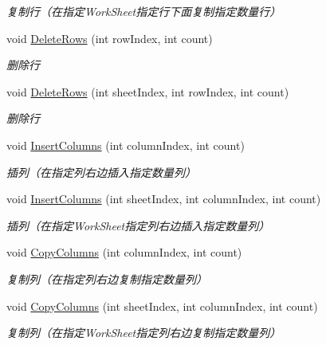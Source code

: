 \begin{DoxyCompactItemize}
\begin{DoxyCompactList}\small\item\em 复制行（在指定\+Work\+Sheet指定行下面复制指定数量行） \end{DoxyCompactList}\item 
void \hyperlink{class_x_c_l_net_tools_1_1_office_1_1_excel_handler_1_1_excel_helper_a04ebe281303c12b0bba570dfc1fb72b5}{Delete\+Rows} (int row\+Index, int count)
\begin{DoxyCompactList}\small\item\em 删除行 \end{DoxyCompactList}\item 
void \hyperlink{class_x_c_l_net_tools_1_1_office_1_1_excel_handler_1_1_excel_helper_a7018591050a42c4e7cfa2d63a76bd519}{Delete\+Rows} (int sheet\+Index, int row\+Index, int count)
\begin{DoxyCompactList}\small\item\em 删除行 \end{DoxyCompactList}\item 
void \hyperlink{class_x_c_l_net_tools_1_1_office_1_1_excel_handler_1_1_excel_helper_acaa208b7a203148f775abaf3bf2e4a06}{Insert\+Columns} (int column\+Index, int count)
\begin{DoxyCompactList}\small\item\em 插列（在指定列右边插入指定数量列） \end{DoxyCompactList}\item 
void \hyperlink{class_x_c_l_net_tools_1_1_office_1_1_excel_handler_1_1_excel_helper_abd72f2dee77fe7ba5e035dac8ef2bc3f}{Insert\+Columns} (int sheet\+Index, int column\+Index, int count)
\begin{DoxyCompactList}\small\item\em 插列（在指定\+Work\+Sheet指定列右边插入指定数量列） \end{DoxyCompactList}\item 
void \hyperlink{class_x_c_l_net_tools_1_1_office_1_1_excel_handler_1_1_excel_helper_a8755580f71c387120cc4e84260ac22dc}{Copy\+Columns} (int column\+Index, int count)
\begin{DoxyCompactList}\small\item\em 复制列（在指定列右边复制指定数量列） \end{DoxyCompactList}\item 
void \hyperlink{class_x_c_l_net_tools_1_1_office_1_1_excel_handler_1_1_excel_helper_a1bc9267c12dd24363a9de2c39550c761}{Copy\+Columns} (int sheet\+Index, int column\+Index, int count)
\begin{DoxyCompactList}\small\item\em 复制列（在指定\+Work\+Sheet指定列右边复制指定数量列） \end{DoxyCompactList}\item 

\end{DoxyCompactItemize}
